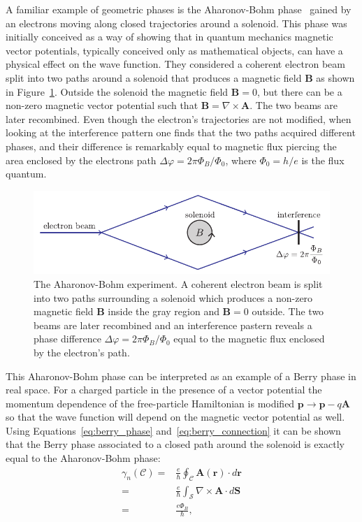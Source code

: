 A familiar example of geometric phases is the Aharonov-Bohm phase~\cite{aharonov_significance_1959} gained by an electrons moving along closed trajectories around a solenoid. This phase was initially conceived as a way of showing that in quantum mechanics magnetic vector potentials, typically conceived only as mathematical objects, can have a physical effect on the wave function. They considered a coherent electron beam split into two paths around a solenoid that produces a magnetic field $\mathbf{B}$ as shown in Figure~\ref{fig:aharonov_bohm}. Outside the solenoid the magnetic field $\mathbf{B}=0$, but there can be a non-zero magnetic vector potential such that $\mathbf{B}=\nabla\times\mathbf{A}$. The two beams are later recombined. Even though the electron's trajectories are not modified, when looking at the interference pattern one finds that the two paths acquired different phases, and their difference is remarkably equal to magnetic flux piercing the area enclosed by the electrons path $\Delta\varphi = 2\pi \Phi_B/\Phi_0$, where $\Phi_0=h/e$ is the flux quantum. 

\begin{figure}[htb]
\begin{center}
\includegraphics[]{Figures/Chapter7/aharonov_bohm.pdf}
\caption[The Aharonov-Bohm experiment]{The Aharonov-Bohm experiment. A coherent electron beam is split into two paths surrounding a solenoid which produces a non-zero magnetic field $\mathbf{B}$ inside the gray region and $\mathbf{B}=0$ outside. The two beams are later recombined and an interference pastern reveals a phase difference $\Delta\varphi = 2\pi \Phi_B/\Phi_0$ equal to the magnetic flux enclosed by the electron's path.}
\label{fig:aharonov_bohm}
\end{center}
\end{figure}

This Aharonov-Bohm phase can be interpreted as an example of a Berry phase in real space. For a charged particle in the presence of a vector potential the momentum dependence of the free-particle Hamiltonian is modified $\mathbf{p}\rightarrow\mathbf{p}-q\mathbf{A}$ so that the wave function will depend on the magnetic vector potential as well. Using Equations~\ref{eq:berry_phase} and~\ref{eq:berry_connection} it can be shown that the Berry phase associated to a closed path around the solenoid is exactly equal to the Aharonov-Bohm phase: 
%
\begin{align}
	\gamma_n(\mathcal{C})=&\frac{e}{\hbar}\oint_{\mathcal{C}}\mathbf{A}(\mathbf{r})\cdot d\mathbf{r} \nonumber \\
	=& \frac{e}{\hbar}\int_{\mathcal{S}}\nabla\times\mathbf{A}\cdot d\mathbf{S} \nonumber \\
	=& \frac{e\Phi_B}{\hbar},
	\label{eq:aharonov_bohm_phase}
\end{align}

